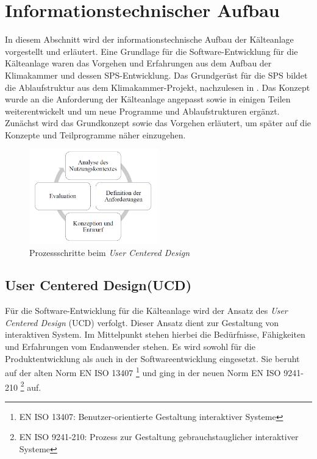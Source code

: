 \section{Informationstechnischer Aufbau}
\label{sec:Informationstechnischer Aufbau}



In diesem Abschnitt wird der informationstechnische Aufbau der Kälteanlage vorgestellt und erläutert. Eine Grundlage für die Software-Entwicklung für die Kälteanlage waren das Vorgehen und Erfahrungen aus dem Aufbau der Klimakammer und dessen SPS-Entwicklung. Das Grundgerüst für die SPS bildet die Ablaufstruktur aus dem Klimakammer-Projekt, nachzulesen in \textsc{\citeauthor{Nuerenberg2015}}. Das Konzept wurde an die Anforderung der Kälteanlage angepasst sowie in einigen Teilen weiterentwickelt und um neue Programme und Ablaufstrukturen ergänzt. Zunächst wird das Grundkonzept sowie das Vorgehen erläutert, um später auf die Konzepte und Teilprogramme näher einzugehen. 

\begin{figure}[htb]
\centering		\includegraphics[width=0.50\textwidth]{Pictures/UCD.png}
\caption{Prozessschritte beim \textit{User Centered Design} \citep{Nuerenberg2015}}
\label{fig:}
\end{figure}

\subsection{User Centered Design(UCD)}
\label{subsec: UCD}

Für die Software-Entwicklung für die Kälteanlage wird der Ansatz des \textit{User Centered Design} (UCD) verfolgt. Dieser Ansatz dient zur Gestaltung von interaktiven System. Im Mittelpunkt stehen hierbei die Bedürfnisse, Fähigkeiten und Erfahrungen vom Endanwender stehen. Es wird sowohl für die Produktentwicklung als auch in der Softwareentwicklung eingesetzt. Sie beruht auf der alten Norm  EN ISO 13407 \footnote{EN ISO 13407: Benutzer-orientierte Gestaltung interaktiver Systeme} und ging in der neuen Norm EN ISO 9241-210 \footnote{EN ISO 9241-210: Prozess zur Gestaltung gebrauchstauglicher interaktiver Systeme}  auf. \citep{Normung2010}

